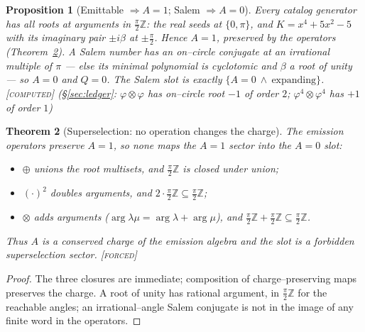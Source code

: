 \documentclass[11pt]{article}
\theoremstyle{plain}
\newtheorem{theorem}{Theorem}[section]
\newtheorem{proposition}[theorem]{Proposition}
\theoremstyle{definition}
\theoremstyle{remark}
\newcommand{\forced}{\textcolor{forcedc}{\textsc{[forced]}}}
\newcommand{\computed}{\textcolor{forcedc}{\textsc{[computed]}}}
\newcommand{\Z}{\mathbb{Z}}
\begin{document}
\begin{proposition}[Emittable $\Rightarrow A=1$; Salem $\Rightarrow A=0$]\label{prop:charge}
Every catalog generator has all roots at arguments in $\tfrac\pi2\Z$: the real seeds at $\{0,\pi\}$, and $K=x^4+5x^2-5$ with its imaginary pair $\pm i\beta$ at $\pm\tfrac\pi2$. Hence $A=1$, preserved by the operators (Theorem~\ref{thm:superselect}). A Salem number has an on--circle conjugate at an irrational multiple of $\pi$ --- else its minimal polynomial is cyclotomic and $\beta$ a root of unity --- so $A=0$ and $Q=0$. The Salem slot is exactly $\{A=0\ \wedge\ \text{expanding}\}$. \computed{} {\small(\S\ref{sec:ledger}: $\varphi{\otimes}\varphi$ has on--circle root $-1$ of order $2$; $\varphi^4{\otimes}\varphi^4$ has $+1$ of order $1$)}
\end{proposition}

\begin{theorem}[Superselection: no operation changes the charge]\label{thm:superselect}
The emission operators preserve $A=1$, so none maps the $A=1$ sector into the $A=0$ slot:
\begin{itemize}[leftmargin=1.5em,itemsep=1pt]
\item $\oplus$ unions the root multisets, and $\tfrac\pi2\Z$ is closed under union;
\item $(\cdot)^2$ doubles arguments, and $2\cdot\tfrac\pi2\Z\subseteq\tfrac\pi2\Z$;
\item $\otimes$ adds arguments ($\arg\lambda\mu=\arg\lambda+\arg\mu$), and $\tfrac\pi2\Z+\tfrac\pi2\Z\subseteq\tfrac\pi2\Z$.
\end{itemize}
Thus $A$ is a conserved charge of the emission algebra and the slot is a forbidden superselection sector. \forced
\end{theorem}
\begin{proof}
The three closures are immediate; composition of charge--preserving maps preserves the charge. A root of unity has rational argument, in $\tfrac\pi2\Z$ for the reachable angles; an irrational--angle Salem conjugate is not in the image of any finite word in the operators.
\end{proof}
\end{document}
